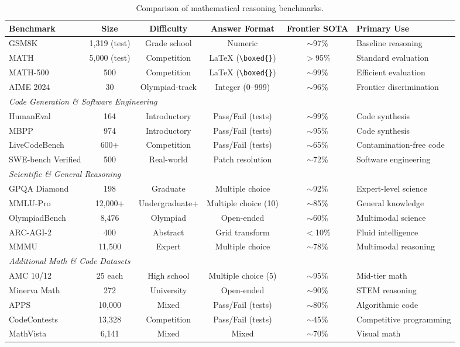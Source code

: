 \documentclass[12pt,a4paper]{report}
\begin{document}
\begin{table}[ht]
\centering
\caption{Comparison of mathematical reasoning benchmarks.}
\label{tab:math-benchmarks}
\small
\begin{tabular}{lccccl}
\toprule
\textbf{Benchmark} & \textbf{Size} & \textbf{Difficulty} & \textbf{Answer Format} & \textbf{Frontier SOTA} & \textbf{Primary Use} \\
\midrule
GSM8K & 1,319 (test) & Grade school & Numeric & $\sim$97\% & Baseline reasoning \\
MATH & 5,000 (test) & Competition & \LaTeX{} (\verb|\boxed{}|) & $>$95\% & Standard evaluation \\
MATH-500 & 500 & Competition & \LaTeX{} (\verb|\boxed{}|) & $\sim$99\% & Efficient evaluation \\
AIME 2024 & 30 & Olympiad-track & Integer (0--999) & $\sim$96\% & Frontier discrimination \\
\midrule
\multicolumn{6}{l}{\textit{Code Generation \& Software Engineering}} \\
\midrule
HumanEval & 164 & Introductory & Pass/Fail (tests) & $\sim$99\% & Code synthesis \\
MBPP & 974 & Introductory & Pass/Fail (tests) & $\sim$95\% & Code synthesis \\
LiveCodeBench & 600+ & Competition & Pass/Fail (tests) & $\sim$65\% & Contamination-free code \\
SWE-bench Verified & 500 & Real-world & Patch resolution & $\sim$72\% & Software engineering \\
\midrule
\multicolumn{6}{l}{\textit{Scientific \& General Reasoning}} \\
\midrule
GPQA Diamond & 198 & Graduate & Multiple choice & $\sim$92\% & Expert-level science \\
MMLU-Pro & 12,000+ & Undergraduate+ & Multiple choice (10) & $\sim$85\% & General knowledge \\
OlympiadBench & 8,476 & Olympiad & Open-ended & $\sim$60\% & Multimodal science \\
ARC-AGI-2 & 400 & Abstract & Grid transform & $<$10\% & Fluid intelligence \\
MMMU & 11,500 & Expert & Multiple choice & $\sim$78\% & Multimodal reasoning \\
\midrule
\multicolumn{6}{l}{\textit{Additional Math \& Code Datasets}} \\
\midrule
AMC 10/12 & 25 each & High school & Multiple choice (5) & $\sim$95\% & Mid-tier math \\
Minerva Math & 272 & University & Open-ended & $\sim$90\% & STEM reasoning \\
APPS & 10,000 & Mixed & Pass/Fail (tests) & $\sim$80\% & Algorithmic code \\
CodeContests & 13,328 & Competition & Pass/Fail (tests) & $\sim$45\% & Competitive programming \\
MathVista & 6,141 & Mixed & Mixed & $\sim$70\% & Visual math \\
\bottomrule
\end{tabular}
\end{table}
\end{document}
